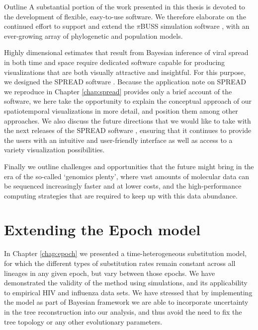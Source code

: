 \begin{remark}{Outline}
A substantial portion of the work presented in this thesis is devoted to the development of flexible, easy-to-use software.
We therefore elaborate on the continued effort to support and extend the $\pi$BUSS simulation software \citep{Bielejec2014b}, with an ever-growing array of phylogenetic and population models.

Highly dimensional estimates that result from Bayesian inference of viral spread in both time and space require dedicated software capable for producing visualizations that are both visually attractive and insightful.
For this purpose, we designed the SPREAD software \citep{Bielejec2011}.
Because the application note on SPREAD we reproduce in Chapter \ref{chap:spread} provides only a brief account of the software, we here take the opportunity to explain the conceptual approach of our spatiotemporal visualizations in more detail, and position them among other approaches.
We also discuss the future directions that we would like to take with the next releases of the SPREAD software \citep{Bielejec2011}, ensuring that it continues to provide the users with an intuitive and user-friendly interface as well as access to a variety visualization possibilities.

Finally we outline challenges and opportunities that the future might bring in the era of the so-called `genomics plenty', where vast amounts of molecular data can be sequenced increasingly faster and at lower costs, and the high-performance computing strategies that are required to keep up with this data abundance.
\end{remark}

\section{Extending the Epoch model}

In Chapter \ref{chap:epoch} we presented a time-heterogeneous substitution model, for which the different types of substitution rates %
remain constant across all lineages in any given epoch, but vary between those epochs.
We have demonstrated the validity of the method using simulations, and its applicability to empirical HIV and influenza data sets.
We have stressed that by implementing the model as part of Bayesian framework we are able to incorporate uncertainty in the tree reconstruction into our analysis, and thus avoid the need to fix the tree topology or any other evolutionary parameters.

